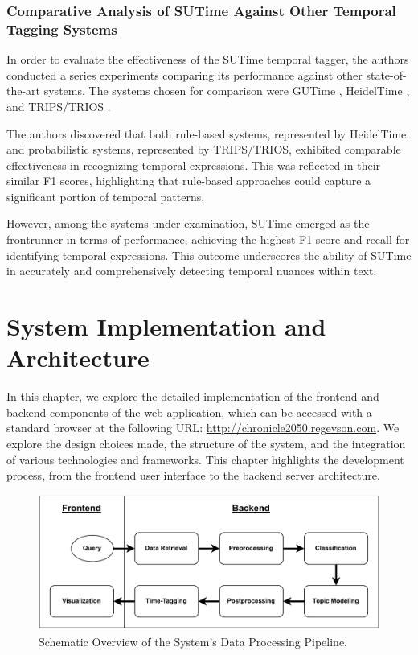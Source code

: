 \documentclass[a4paper,10pt]{report}
\begin{document}
\subsection{Comparative Analysis of SUTime Against Other Temporal Tagging Systems}
In order to evaluate the effectiveness of the SUTime temporal tagger, the authors conducted a series experiments comparing its performance against other state-of-the-art systems. The systems chosen for comparison were GUTime \cite{gutime}, HeidelTime \cite{heideltime}, and TRIPS/TRIOS \cite{trips}.

The authors discovered that both rule-based systems, represented by HeidelTime, and probabilistic systems, represented by TRIPS/TRIOS, exhibited comparable effectiveness in recognizing temporal expressions. This was reflected in their similar F1 scores, highlighting that rule-based approaches could capture a significant portion of temporal patterns.

However, among the systems under examination, SUTime emerged as the frontrunner in terms of performance, achieving the highest F1 score and recall for identifying temporal expressions. \cite{sutime} This outcome underscores the ability of SUTime in accurately and comprehensively detecting temporal nuances within text.


\chapter{System Implementation and Architecture}
In this chapter, we explore the detailed implementation of the frontend and backend components of the web application, which can be accessed with a standard browser at the following URL: \url{http://chronicle2050.regevson.com}. We explore the design choices made, the structure of the system, and the integration of various technologies and frameworks. This chapter highlights the development process, from the frontend user interface to the backend server architecture.

\begin{figure}[H]
\centering
\includegraphics[width=13cm]{img/system.pdf}
\caption{Schematic Overview of the System's Data Processing Pipeline.}
\label{fig:archi}
\end{figure}
\end{document}
